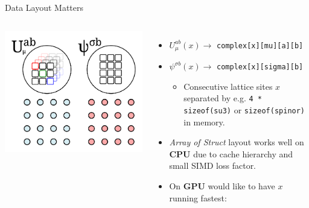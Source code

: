 \begin{frame}{Data Layout Matters}
  \begin{columns}
      \begin{center}
        \includegraphics[width=0.85\linewidth]{graphics/grid_su3_spinor}
      \end{center}
      \begin{itemize}
        \item<1-> $U^{ab}_\mu(x) \rightarrow$ \texttt{complex[x][mu][a][b]}
        \vspace{0.2cm}
        \item<1-> $\psi^{\sigma b}(x) \rightarrow$ \texttt{complex[x][sigma][b]}
        \vspace{0.2cm}
        \begin{itemize}
          \item<2-> Consecutive lattice sites $x$ separated by e.g. \texttt{4 * sizeof(su3)} or \texttt{sizeof(spinor)} in memory.
        \end{itemize}
        \vspace{0.6cm}
        \item<3-> \emph{Array of Struct} layout works well on \textbf{CPU} due to cache hierarchy and small SIMD loss factor.
        \vspace{0.6cm}
        \item<4-> On \textbf{GPU} would like to have $x$ running fastest:
        \vspace{0.2cm}
        \begin{itemize}

\end{itemize}
\end{itemize}
\end{columns}
\end{frame}
